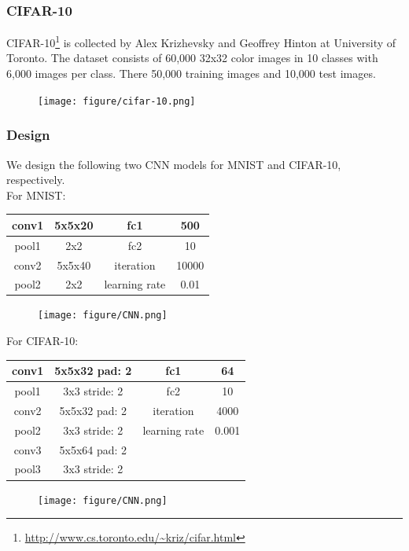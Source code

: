 \documentclass[10pt, mathserif]{beamer}	%
\newcommand{\ftitle}[1]{\frametitle{\hspace{4ex} {#1}}}	%
\begin{document}
\begin{CJK}{UTF8}{song}
\begin{frame}
	\ftitle{CIFAR-10}
	\quad CIFAR-10\footnote{\url{http://www.cs.toronto.edu/~kriz/cifar.html}} is collected by Alex Krizhevsky and Geoffrey Hinton at University of Toronto. The dataset consists of 60,000 32x32 color images in 10 classes with 6,000 images per class. There 50,000 training images and 10,000 test images.
	\begin{figure}[htbp]
		\centering
		\texttt{[image: figure/cifar-10.png]}
	\end{figure}
\end{frame}

\begin{frame}
	\ftitle{Design}
	We design the following two CNN models for MNIST and CIFAR-10, respectively. \\
	For MNIST:
	\begin{table}[htbp]
		\centering
		\begin{tabular}{cc|cc}
			conv1	&	5x5x20	&	fc1	&	500 \\
			\hline
			pool1	&	2x2	    &	fc2	&	10  \\
			\hline
			conv2	&	5x5x40	&	iteration	& 10000 \\
			\hline
			pool2	&	2x2  	&	learning rate & 0.01 
		\end{tabular}
	\end{table}
	\begin{figure}[htbp]
		\centering
		\texttt{[image: figure/CNN.png]}
	\end{figure}
\end{frame}

\begin{frame}
	For CIFAR-10:
	\begin{table}[htbp]
		\centering
		\begin{tabular}{cc|cc}
			conv1	&	5x5x32 pad: 2	&	fc1	&	64 \\
			\hline
			pool1	&	3x3 stride: 2	    &	fc2	&	10  \\
			\hline
			conv2	&	5x5x32 pad: 2	&	iteration	& 4000 \\
			\hline
			pool2	&	3x3 stride: 2  	&	learning rate & 0.001 \\
			\hline
			conv3	&	5x5x64 pad: 2	& & \\
			\hline
			pool3	&	3x3 stride: 2  	& &  
		\end{tabular}
	\end{table}
	\begin{figure}[htbp]
		\centering
		\texttt{[image: figure/CNN.png]}
	\end{figure}
\end{frame}


\end{CJK}
\end{document}

